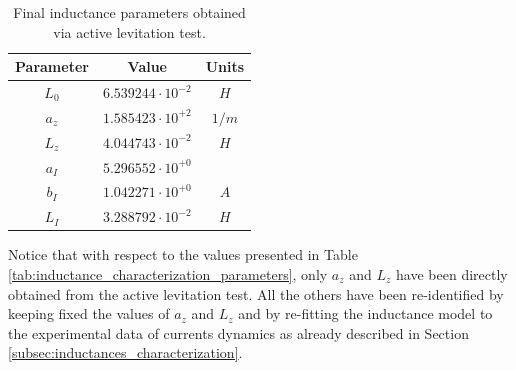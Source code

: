 \begin{table}[H]
    \centering
    \begin{tabular}{|c|c|c|}
        \hline
        \textbf{Parameter} & \textbf{Value}           & \textbf{Units} \\
        \hline
        $L_0$              & $6.539244 \cdot 10^{-2}$ & $H$            \\
        $a_z$              & $1.585423 \cdot 10^{+2}$ & $1/m$          \\
        $L_z$              & $4.044743 \cdot 10^{-2}$ & $H$            \\
        $a_I$              & $5.296552 \cdot 10^{+0}$ &                \\
        $b_I$              & $1.042271 \cdot 10^{+0}$ & $A$            \\
        $L_I$              & $3.288792 \cdot 10^{-2}$ & $H$            \\
        \hline
    \end{tabular}

    \caption{Final inductance parameters obtained via active levitation test.}
    \label{tab:final_inductance_characterization_parameters}

\end{table}

Notice that with respect to the values presented in Table \ref{tab:inductance_characterization_parameters}, only $a_z$ and $L_z$ have been directly obtained from the active levitation test.
All the others have been re-identified by keeping fixed the values of $a_z$ and $L_z$ and by re-fitting the inductance model to the experimental data of currents dynamics as already described in Section \ref{subsec:inductances_characterization}.



